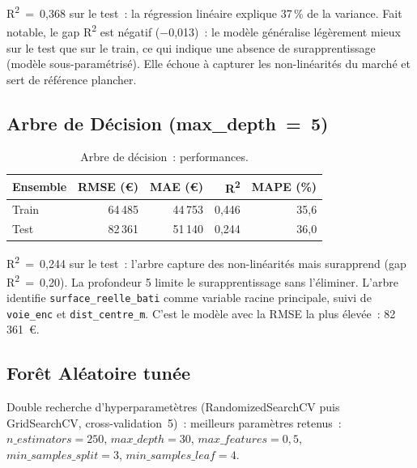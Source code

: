 \documentclass[12pt,a4paper]{article}
\begin{document}
\begin{descrbox}
R\textsuperscript{2}~=~0{,}368 sur le test~: la r\'egression lin\'eaire explique 37\,\% de la variance. Fait notable, le gap R\textsuperscript{2} est n\'egatif ($-$0{,}013)~: le mod\`ele g\'en\'eralise l\'eg\`erement mieux sur le test que sur le train, ce qui indique une absence de surapprentissage (mod\`ele sous-param\'etris\'e). Elle \'echoue \`a capturer les non-lin\'earit\'es du march\'e et sert de r\'ef\'erence plancher.
\end{descrbox}

\subsection{Arbre de D\'ecision (max\_depth~=~5)}

\begin{table}[H]
\centering
\caption{Arbre de d\'ecision~: performances.}
\label{tab:dt}
\begin{tabular}{lrrrr}
\toprule
\textbf{Ensemble} & \textbf{RMSE (\euro)} & \textbf{MAE (\euro)} & \textbf{R\textsuperscript{2}} & \textbf{MAPE (\%)} \\
\midrule
Train & 64\,485 & 44\,753 & 0{,}446 & 35{,}6 \\
Test  & 82\,361 & 51\,140 & 0{,}244 & 36{,}0 \\
\bottomrule
\end{tabular}
\end{table}

\begin{descrbox}
R\textsuperscript{2}~=~0{,}244 sur le test~: l'arbre capture des non-lin\'earit\'es mais surapprend (gap R\textsuperscript{2}~=~0{,}20). La profondeur 5 limite le surapprentissage sans l'\'eliminer. L'arbre identifie \texttt{surface\_reelle\_bati} comme variable racine principale, suivi de \texttt{voie\_enc} et \texttt{dist\_centre\_m}. C'est le mod\`ele avec la RMSE la plus \'elev\'ee~: 82\,361~\euro.
\end{descrbox}

\subsection{For\^et Al\'eatoire tun\'ee}

Double recherche d'hyperparamet\`etres (RandomizedSearchCV puis GridSearchCV, cross-validation~5)~: meilleurs param\`etres retenus~: $n\_estimators=250$, $max\_depth=30$, $max\_features=0{,}5$, $min\_samples\_split=3$, $min\_samples\_leaf=4$.
\end{document}
